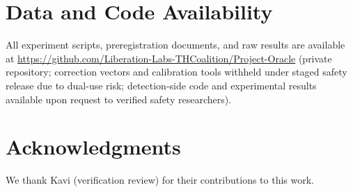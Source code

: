 \documentclass[11pt,a4paper]{article}
\begin{document}
\section*{Data and Code Availability}

All experiment scripts, preregistration documents, and raw results are
available at
\url{https://github.com/Liberation-Labs-THCoalition/Project-Oracle}
(private repository; correction vectors and calibration tools withheld
under staged safety release due to dual-use risk; detection-side code
and experimental results available upon request to verified safety
researchers).

\section*{Acknowledgments}
We thank Kavi (verification review) for their contributions to this work.



\end{document}
